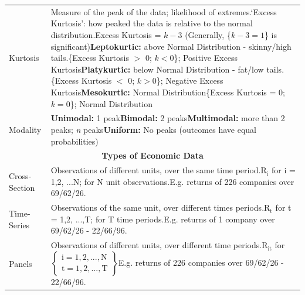 \documentclass[11pt, english]{article}
\begin{document}
\begin{center}
\begin{longtable}{p{3cm}p{9cm}}
			Kurtosis & Measure of the peak of the data; likelihood of extremes.\newline `Excess Kurtosis’: how peaked the data is relative to the normal distribution.\newline Excess Kurtosis = $k-3$ (Generally, \{$k-3=1$\} is significant)\newline \textbf{Leptokurtic: }above Normal Distribution - skinny/high tails.\newline \{Excess Kurtosis $>$ 0; $k<0$\}; Positive Excess Kurtosis\newline \textbf{Platykurtic: }below Normal Distribution - fat/low tails.\newline \{Excess Kurtosis $<$ 0; $k>0$\}; Negative Excess Kurtosis\newline \textbf{Mesokurtic: }Normal Distribution\newline \{Excess Kurtosis = 0; $k=0$\}; Normal Distribution\\
			Modality & \textbf{Unimodal: }1 peak\newline \textbf{Bimodal: }2 peaks\newline \textbf{Multimodal: }more than 2 peaks; \textit{n} peaks\newline \textbf{Uniform: }No peaks (outcomes have equal probabilities)\\
			\hline
			\hline
			\multicolumn{2}{c}{\textbf{Types of Economic Data}}\\
			\hline
			\hline
			Cross-Section & Observations of different units, over the same time period.\newline $\mathrm{R_i}$ for i = 1,2, ...N; for N unit observations.\newline E.g. returns of 226 companies over 69/62/26.\\
			Time-Series & Observations of the same unit, over different times periods.\newline $\mathrm{R_t}$ for t = 1,2, ...,T; for T time periods.\newline E.g. returns of 1 company over 69/62/26 - 22/66/96.\\
			Panels & Observations of different units, over different time periods.\newline $\mathrm{R_{it}}$ for $\mathrm{\begin{Bmatrix}\textrm{i}=1,2, ...,\textrm{N}\\ \textrm{t}=1,2, ...,\textrm{T}\end{Bmatrix}}$\newline E.g. returns of 226 companies over 69/62/26 - 22/66/96.\\
			\hline
		\end{longtable}
		\end{center}
\end{document}
